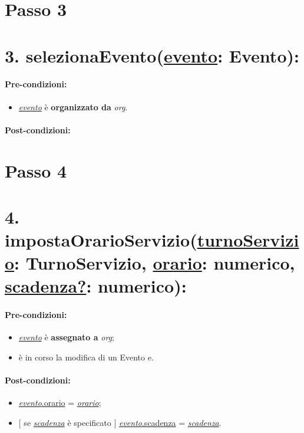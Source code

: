 
\section{Passo 3}
\section*{3. selezionaEvento(\underline{evento}: Evento):}

\paragraph{Pre-condizioni:}
\begin{itemize}
     \item \underline{\textit{evento}} è \textbf{organizzato da} {\textit{org}}.
\end{itemize}

\paragraph{Post-condizioni:}

\section{Passo 4}
\section*{4. impostaOrarioServizio(\underline{turnoServizio}: TurnoServizio, \underline{orario}: numerico, \underline{scadenza?}: numerico):}

\paragraph{Pre-condizioni:}
\begin{itemize}
    \item \underline{\textit{evento}} è \textbf{assegnato a} {\textit{org}};
    \item è in corso la modifica di un Evento e.
\end{itemize}

\paragraph{Post-condizioni:}
 \begin{itemize}
    \item\underline{\textit{evento}.orario} = \underline{\textit{orario}};

    \item $[$ se \underline{\textit{scadenza}} è specificato $]$ \underline{\textit{evento}.scadenza} = \underline{\textit{scadenza}}.
\end{itemize}

